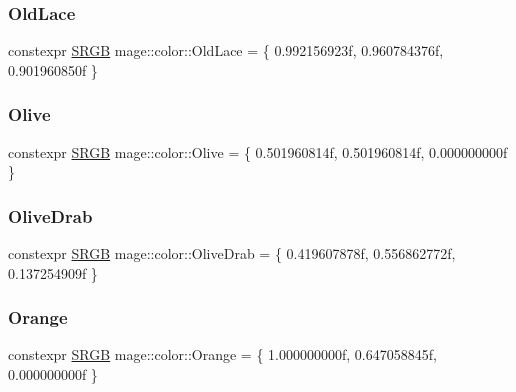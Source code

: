 \hypertarget{namespacemage_1_1color_abe3c9722c3cbab17e0d3890dd32bd93e}{}\label{namespacemage_1_1color_abe3c9722c3cbab17e0d3890dd32bd93e} 
\subsubsection{\texorpdfstring{Old\+Lace}{OldLace}}
{\footnotesize\ttfamily constexpr \hyperlink{structmage_1_1_s_r_g_b}{S\+R\+GB} mage\+::color\+::\+Old\+Lace = \{ 0.\+992156923f, 0.\+960784376f, 0.\+901960850f \}}

\hypertarget{namespacemage_1_1color_a7acb7a37c622e61615f548587d6b427c}{}\label{namespacemage_1_1color_a7acb7a37c622e61615f548587d6b427c} 
\subsubsection{\texorpdfstring{Olive}{Olive}}
{\footnotesize\ttfamily constexpr \hyperlink{structmage_1_1_s_r_g_b}{S\+R\+GB} mage\+::color\+::\+Olive = \{ 0.\+501960814f, 0.\+501960814f, 0.\+000000000f \}}

\hypertarget{namespacemage_1_1color_a151c92b265a81f3d8dd4eac81dc133ef}{}\label{namespacemage_1_1color_a151c92b265a81f3d8dd4eac81dc133ef} 
\subsubsection{\texorpdfstring{Olive\+Drab}{OliveDrab}}
{\footnotesize\ttfamily constexpr \hyperlink{structmage_1_1_s_r_g_b}{S\+R\+GB} mage\+::color\+::\+Olive\+Drab = \{ 0.\+419607878f, 0.\+556862772f, 0.\+137254909f \}}

\hypertarget{namespacemage_1_1color_aabcf43da8629ad2e50ccc9d89825e52f}{}\label{namespacemage_1_1color_aabcf43da8629ad2e50ccc9d89825e52f} 
\subsubsection{\texorpdfstring{Orange}{Orange}}
{\footnotesize\ttfamily constexpr \hyperlink{structmage_1_1_s_r_g_b}{S\+R\+GB} mage\+::color\+::\+Orange = \{ 1.\+000000000f, 0.\+647058845f, 0.\+000000000f \}}

